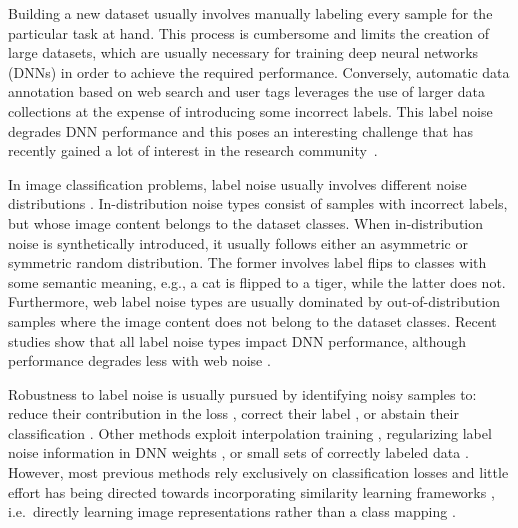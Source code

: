 \documentclass[final]{cvpr}
\begin{document}
Building a new dataset usually involves manually labeling every sample for the particular task at hand. This process is cumbersome and limits the creation of large datasets, which are usually necessary for training deep neural networks (DNNs) in order to achieve the required performance. Conversely, automatic data annotation based on web search and user tags \cite{2017_arXiv_WebVision,2020_ICML_DatasetOOD} leverages the use of larger data collections at the expense of introducing some incorrect labels. This label noise degrades DNN performance \cite{2017_ICML_Memorization,2017_ICLR_Rethinking} and this poses an interesting challenge that has recently gained a lot of interest in the research community~\cite{2018_CVPR_IterativeNoise,2018_CVPR_JointOpt,2018_ICML_MentorNet,2019_CVPR_JointOptimizImproved,2019_ICCV_PrototypesBootstrapping,2019_ICML_DynamicBootstrapping,2020_ICLR_DivideMix,2020_CVPR_EffectiveSupervision,2020_ICML_NNweightsNoise,2020_ICML_NormalizedLossFunc}.

In image classification problems, label noise usually involves different noise distributions \cite{2020_ICML_DatasetOOD,2020_CVPR_EffectiveSupervision}. In-distribution noise types consist of samples with incorrect labels, but whose image content belongs to the dataset classes. When in-distribution noise is synthetically introduced, it usually follows either an asymmetric or symmetric random distribution. The former involves label flips to classes with some semantic meaning, e.g., a cat is flipped to a tiger, while the latter does not. Furthermore, web label noise types are usually dominated by out-of-distribution samples where the image content does not belong to the dataset classes. Recent studies show that all label noise types impact DNN performance, although performance degrades less with web noise \cite{2020_ICML_DatasetOOD,2020_ICPR_SSLnoise}.

Robustness to label noise is usually pursued by identifying noisy samples to: reduce their contribution in the loss \cite{2018_ICML_MentorNet,2018_NeurIPS_CoTeaching}, correct their label \cite{2019_ICML_DynamicBootstrapping,2020_ICLR_DivideMix}, or abstain their classification \cite{2019_ICML_AbstentionLabelNoise}. Other methods exploit interpolation training \cite{2018_ICLR_mixup}, regularizing label noise information in DNN weights \cite{2020_ICML_NNweightsNoise},
or small sets of correctly labeled data \cite{2018_NIPS_GoldLoss,2020_CVPR_EffectiveSupervision}. However, most previous methods rely exclusively on classification losses and little effort has being directed towards incorporating similarity learning frameworks \cite{2020_ECCV_MetricLearningReality}, i.e.~directly learning image representations rather than a class mapping \cite{2018_CVPR_IterativeNoise}.
\end{document}
